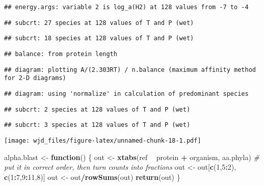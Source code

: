 \documentclass[]{article}
\newenvironment{Shaded}{\begin{snugshade}}{\end{snugshade}}
\newcommand{\KeywordTok}[1]{\textcolor[rgb]{0.13,0.29,0.53}{\textbf{#1}}}
\newcommand{\DecValTok}[1]{\textcolor[rgb]{0.00,0.00,0.81}{#1}}
\newcommand{\StringTok}[1]{\textcolor[rgb]{0.31,0.60,0.02}{#1}}
\newcommand{\CommentTok}[1]{\textcolor[rgb]{0.56,0.35,0.01}{\textit{#1}}}
\newcommand{\ControlFlowTok}[1]{\textcolor[rgb]{0.13,0.29,0.53}{\textbf{#1}}}
\newcommand{\OperatorTok}[1]{\textcolor[rgb]{0.81,0.36,0.00}{\textbf{#1}}}
\newcommand{\NormalTok}[1]{#1}
\begin{document}
\begin{verbatim}
## energy.args: variable 2 is log_a(H2) at 128 values from -7 to -4
\end{verbatim}

\begin{verbatim}
## subcrt: 27 species at 128 values of T and P (wet)
\end{verbatim}

\begin{verbatim}
## subcrt: 18 species at 128 values of T and P (wet)
\end{verbatim}

\begin{verbatim}
## balance: from protein length
\end{verbatim}

\begin{verbatim}
## diagram: plotting A/(2.303RT) / n.balance (maximum affinity method for 2-D diagrams)
\end{verbatim}

\begin{verbatim}
## diagram: using 'normalize' in calculation of predominant species
\end{verbatim}

\begin{verbatim}
## subcrt: 2 species at 128 values of T and P (wet)
\end{verbatim}

\begin{verbatim}
## subcrt: 3 species at 128 values of T and P (wet)
\end{verbatim}

\texttt{[image: wjd\_files/figure-latex/unnamed-chunk-18-1.pdf]}

\begin{Shaded}
\begin{Highlighting}[]
\NormalTok{alpha.blast <-}\StringTok{ }\ControlFlowTok{function}\NormalTok{() \{}
\NormalTok{out <-}\StringTok{ }\KeywordTok{xtabs}\NormalTok{(ref }\OperatorTok{~}\StringTok{ }\NormalTok{protein }\OperatorTok{+}\StringTok{ }\NormalTok{organism, aa.phyla)}
\CommentTok{# put it in correct order, then turn counts into fractions}
\NormalTok{out <-}\StringTok{ }\NormalTok{out[}\KeywordTok{c}\NormalTok{(}\DecValTok{1}\NormalTok{,}\DecValTok{5}\OperatorTok{:}\DecValTok{2}\NormalTok{), }\KeywordTok{c}\NormalTok{(}\DecValTok{1}\OperatorTok{:}\DecValTok{7}\NormalTok{,}\DecValTok{9}\OperatorTok{:}\DecValTok{11}\NormalTok{,}\DecValTok{8}\NormalTok{)]}
\NormalTok{out <-}\StringTok{ }\NormalTok{out}\OperatorTok{/}\KeywordTok{rowSums}\NormalTok{(out)}
\KeywordTok{return}\NormalTok{(out)}
\NormalTok{\}}
\end{Highlighting}
\end{Shaded}
\end{document}
